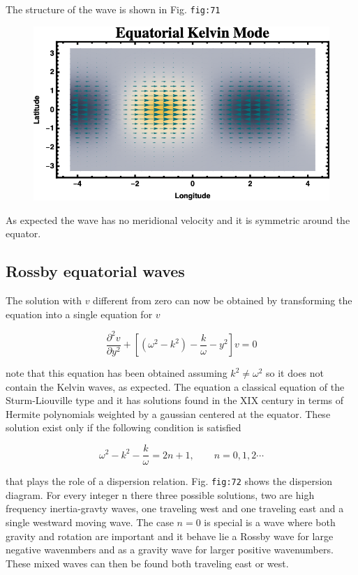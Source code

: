 The structure of the wave is shown in Fig. \texttt{fig:71}

\begin{figure}
\centering
\includegraphics[width = .7 \textwidth]{figs/GD/KelvinWave.png}
\caption{}
\end{figure}

As expected the wave has no meridional velocity and it is symmetric
around the equator.

\subsection{Rossby equatorial waves}\label{rossby-equatorial-waves}

The solution with \(v\) different from zero can now be obtained by
transforming the equation into a single equation for \(v\)

\[\frac{\partial^{2} v}{\partial y^{2}} + \left[ (\omega^2 - k^2) -\frac{k}{\omega} - y^2\right] v = 0\]

note that this equation has been obtained assuming \(k^2 \neq \omega^2\)
so it does not contain the Kelvin waves, as expected. The equation a
classical equation of the Sturm-Liouville type and it has solutions
found in the XIX century in terms of Hermite polynomials weighted by a
gaussian centered at the equator. These solution exist only if the
following condition is satisfied

\[\omega^2 - k^2 -\frac{k}{\omega} = 2 n + 1, \qquad  n=0,1,2\cdots\]

that plays the role of a dispersion relation. Fig. \texttt{fig:72} shows
the dispersion diagram. For every integer n there three possible
solutions, two are high frequency inertia-gravty waves, one traveling
west and one traveling east and a single westward moving wave. The case
\(n=0\) is special is a wave where both gravity and rotation are
important and it behave lie a Rossby wave for large negative wavenmbers
and as a gravity wave for larger positive wavenumbers. These mixed waves
can then be found both traveling east or west.

